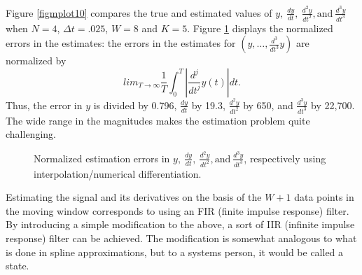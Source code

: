 Figure \ref{figmplot10} compares the true and estimated values of
$y, \ \frac{dy}{dt}, \
\frac{d^2y}{dt^2}, \mbox{and} \
\frac{d^3y}{dt^3}$ when $N=4$, $\Delta t = .025$, $W=8$ and $K=5$. 
Figure \ref{figsineinterp} displays the normalized errors
in the estimates: the errors in the estimates 
for $(y, \ldots, \frac{d^3}{dt^3}y)$ are normalized
by 
\begin{equation}
lim_{T \rightarrow \infty} \frac{1}{T} \int_{0}^{T}{|\frac{d^j}{dt^j}y(t)| dt}.
\label{scales}
\end{equation}
Thus, the error in $y$ is divided by 0.796, $\frac{dy}{dt}$ by 19.3,
$\frac{d^2y}{dt^2}$ by 650, 
and $\frac{d^3y}{dt^3}$ by 22,700.  The wide range in the magnitudes makes the
estimation problem quite challenging.


\begin{figure}[hbt]
\centerline{}
\smallskip
\small
\caption{Normalized estimation errors in $y, \ \frac{dy}{dt}, \
\frac{d^2y}{dt^2}, \mbox{and} \
\frac{d^3y}{dt^3}$, respectively using interpolation/numerical differentiation.}
\label{figsineinterp}
\end{figure}


Estimating the signal and its derivatives on the basis of 
the $W + 1$ data points in the moving window corresponds to using
an FIR (finite impulse response) 
filter.  By introducing a simple modification
to the above, a sort of IIR (infinite
impulse response) filter can be achieved.  The modification is somewhat
analogous to 
what is done in spline
approximations, but to a systems person, it would be called a state.

